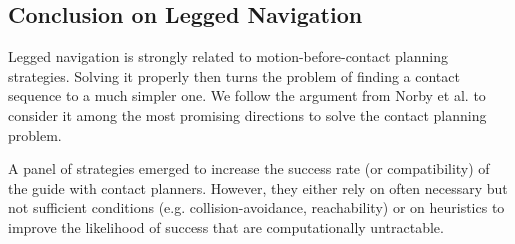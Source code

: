 






\subsection{Conclusion on Legged Navigation}


Legged navigation is strongly related to motion-before-contact planning strategies. 
Solving it properly then turns the problem of finding a contact sequence to a much simpler one.
We follow the argument from Norby et al. \cite{norby_skd_2022} to consider it among the most promising directions to solve the contact planning problem.


A panel of strategies emerged to increase the success rate (or compatibility) of the guide with contact planners.
However, they either rely on often necessary but not sufficient conditions (e.g. collision-avoidance, reachability) or on heuristics to improve the likelihood of success that are computationally untractable.




